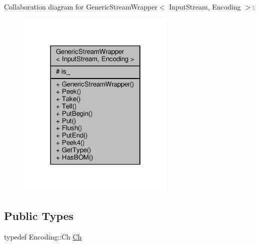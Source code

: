 Collaboration diagram for Generic\+Stream\+Wrapper$<$ Input\+Stream, Encoding $>$\+:
\nopagebreak
\begin{figure}[H]
\begin{center}
\leavevmode
\includegraphics[width=214pt]{classGenericStreamWrapper__coll__graph}
\end{center}
\end{figure}
\subsection*{Public Types}
\begin{DoxyCompactItemize}
\item 
typedef Encoding\+::\+Ch \hyperlink{classGenericStreamWrapper_aef9e89bc4997497315bde1b60e8bb848}{Ch}
\end{DoxyCompactItemize}
